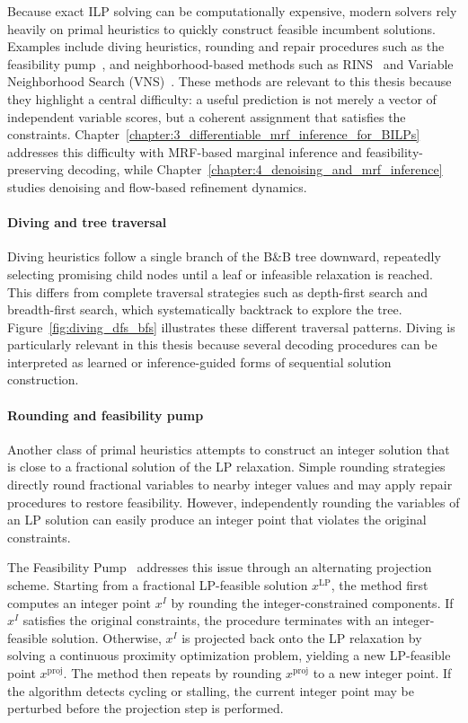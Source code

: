 Because exact ILP solving can be computationally expensive, modern solvers rely heavily on primal heuristics to quickly construct feasible incumbent solutions. Examples include diving heuristics, rounding and repair procedures such as the feasibility pump~\cite{fischetti_feasibility_2005}, and neighborhood-based methods such as RINS~\cite{danna_exploring_2005} and Variable Neighborhood Search (VNS)~\cite{mladenovic_variable_1997,hansen_variable_2008}. These methods are relevant to this thesis because they highlight a central difficulty: a useful prediction is not merely a vector of independent variable scores, but a coherent assignment that satisfies the constraints. Chapter~\ref{chapter:3_differentiable_mrf_inference_for_BILPs} addresses this difficulty with MRF-based marginal inference and feasibility-preserving decoding, while Chapter~\ref{chapter:4_denoising_and_mrf_inference} studies denoising and flow-based refinement dynamics.

\paragraph{Diving and tree traversal}
Diving heuristics follow a single branch of the B\&B tree downward, repeatedly selecting promising child nodes until a leaf or infeasible relaxation is reached. This differs from complete traversal strategies such as depth-first search and breadth-first search, which systematically backtrack to explore the tree. Figure~\ref{fig:diving_dfs_bfs} illustrates these different traversal patterns. Diving is particularly relevant in this thesis because several decoding procedures can be interpreted as learned or inference-guided forms of sequential solution construction.



\paragraph{Rounding and feasibility pump}
Another class of primal heuristics attempts to construct an integer solution that is close to a fractional solution of the LP relaxation. Simple rounding strategies directly round fractional variables to nearby integer values and may apply repair procedures to restore feasibility. However, independently rounding the variables of an LP solution can easily produce an integer point that violates the original constraints.

The Feasibility Pump~\cite{fischetti_feasibility_2005} addresses this issue through an alternating projection scheme. Starting from a fractional LP-feasible solution $x^{\mathrm{LP}}$, the method first computes an integer point $x^I$ by rounding the integer-constrained components. If $x^I$ satisfies the original constraints, the procedure terminates with an integer-feasible solution. Otherwise, $x^I$ is projected back onto the LP relaxation by solving a continuous proximity optimization problem, yielding a new LP-feasible point $x^{\mathrm{proj}}$. The method then repeats by rounding $x^{\mathrm{proj}}$ to a new integer point. If the algorithm detects cycling or stalling, the current integer point may be perturbed before the projection step is performed.

